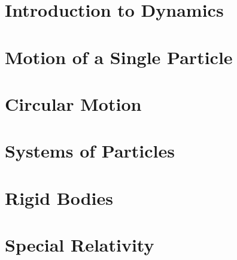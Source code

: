 \documentclass[british,11pt,a4paper]{report}
\begin{document}
\maketitle
\tableofcontents
\chapter{Introduction to Dynamics}
\label{chapIntro}

\chapter{Motion of a Single Particle}
\label{chapSingleParticle}

\chapter{Circular Motion}
\label{chapCircMotion}
\chapter{Systems of Particles}
\label{chapMultipleParticle}
\chapter{Rigid Bodies}
\label{chapRigidBodies}
\chapter{Special Relativity}
\label{chapSpecialRel}
\end{document}
